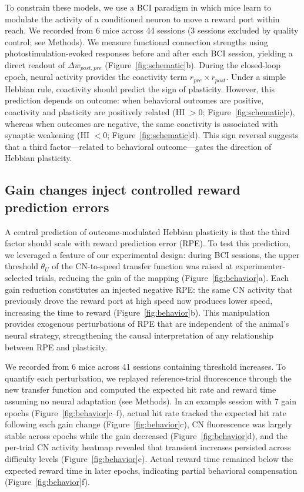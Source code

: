 \documentclass[
  journal=medium,
  manuscript=preprint,
  year=2026
]{aind-preprint}
\begin{document}
To constrain these models, we use a BCI paradigm in which mice learn to modulate the activity of a conditioned neuron to move a reward port within reach. We recorded from 6 mice across 44 sessions (3 sessions excluded by quality control; see Methods). We measure functional connection strengths using photostimulation-evoked responses before and after each BCI session, yielding a direct readout of $\Delta w_{post,pre}$ (Figure~\ref{fig:schematic}b). During the closed-loop epoch, neural activity provides the coactivity term $r_{pre} \times r_{post}$. Under a simple Hebbian rule, coactivity should predict the sign of plasticity. However, this prediction depends on outcome: when behavioral outcomes are positive, coactivity and plasticity are positively related (HI $> 0$; Figure~\ref{fig:schematic}c), whereas when outcomes are negative, the same coactivity is associated with synaptic weakening (HI $< 0$; Figure~\ref{fig:schematic}d). This sign reversal suggests that a third factor---related to behavioral outcome---gates the direction of Hebbian plasticity.

\subsection{Gain changes inject controlled reward prediction errors}

A central prediction of outcome-modulated Hebbian plasticity is that the third factor should scale with reward prediction error (RPE). To test this prediction, we leveraged a feature of our experimental design: during BCI sessions, the upper threshold $\theta_U$ of the CN-to-speed transfer function was raised at experimenter-selected trials, reducing the gain of the mapping (Figure~\ref{fig:behavior}a). Each gain reduction constitutes an injected negative RPE: the same CN activity that previously drove the reward port at high speed now produces lower speed, increasing the time to reward (Figure~\ref{fig:behavior}b). This manipulation provides exogenous perturbations of RPE that are independent of the animal's neural strategy, strengthening the causal interpretation of any relationship between RPE and plasticity.

We recorded from 6 mice across 41 sessions containing threshold increases. To quantify each perturbation, we replayed reference-trial fluorescence through the new transfer function and computed the expected hit rate and reward time assuming no neural adaptation (see Methods). In an example session with 7 gain epochs (Figure~\ref{fig:behavior}c--f), actual hit rate tracked the expected hit rate following each gain change (Figure~\ref{fig:behavior}c), CN fluorescence was largely stable across epochs while the gain decreased (Figure~\ref{fig:behavior}d), and the per-trial CN activity heatmap revealed that transient increases persisted across difficulty levels (Figure~\ref{fig:behavior}e). Actual reward time remained below the expected reward time in later epochs, indicating partial behavioral compensation (Figure~\ref{fig:behavior}f).
\end{document}
